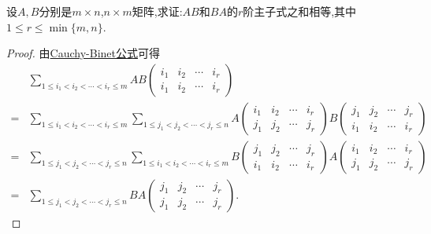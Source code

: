 \documentclass[../../main.tex]{subfiles}%
\begin{document}
\begin{example}
设\(A,B\)分别是\(m\times n\),\(n\times m\)矩阵,求证:\(AB\)和\(BA\)的\(r\)阶主子式之和相等,其中\(1\leqslant  r\leqslant \min\{m,n\}\).
\end{example}
\begin{proof}

由\hyperref[theorem:Cauchy-Binet公式]{Cauchy-Binet公式}可得
\begin{align*}
&\sum_{1\leqslant  i_1 < i_2 < \cdots < i_r\leqslant  m}AB\begin{pmatrix}
i_1 & i_2 & \cdots & i_r\\
i_1 & i_2 & \cdots & i_r
\end{pmatrix}\\
=&\sum_{1\leqslant  i_1 < i_2 < \cdots < i_r\leqslant  m}\sum_{1\leqslant  j_1 < j_2 < \cdots < j_r\leqslant  n}A\begin{pmatrix}
i_1 & i_2 & \cdots & i_r\\
j_1 & j_2 & \cdots & j_r
\end{pmatrix}B\begin{pmatrix}
j_1 & j_2 & \cdots & j_r\\
i_1 & i_2 & \cdots & i_r
\end{pmatrix}\\
=&\sum_{1\leqslant  j_1 < j_2 < \cdots < j_r\leqslant  n}\sum_{1\leqslant  i_1 < i_2 < \cdots < i_r\leqslant  m}B\begin{pmatrix}
j_1 & j_2 & \cdots & j_r\\
i_1 & i_2 & \cdots & i_r
\end{pmatrix}A\begin{pmatrix}
i_1 & i_2 & \cdots & i_r\\
j_1 & j_2 & \cdots & j_r
\end{pmatrix}\\
=&\sum_{1\leqslant  j_1 < j_2 < \cdots < j_r\leqslant  n}BA\begin{pmatrix}
j_1 & j_2 & \cdots & j_r\\
j_1 & j_2 & \cdots & j_r
\end{pmatrix}.
\end{align*}

\end{proof}
\end{document}
